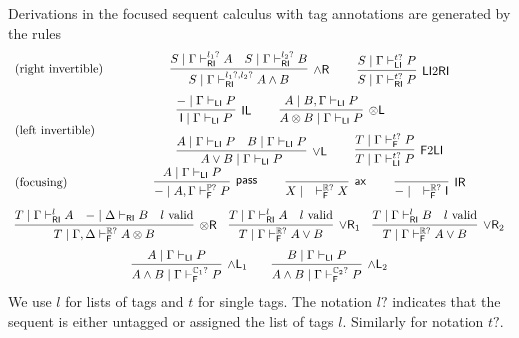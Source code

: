 \documentclass[submission,copyright,creativecommons]{eptcs}
\theoremstyle{definition}
\newcommand{\tl}{\otimes \mathsf{L}}
\newcommand{\tr}{\otimes \mathsf{R}}
\newcommand{\pass}{\mathsf{pass}}
\newcommand{\unitl}{\mathsf{IL}}
\newcommand{\unitr}{\mathsf{IR}}
\newcommand{\andlone}{\land \mathsf{L}_{1}}
\newcommand{\andltwo}{\land \mathsf{L}_{2}}
\newcommand{\andr}{\land \mathsf{R}}
\newcommand{\orl}{\lor \mathsf{L}}
\newcommand{\orrone}{\lor \mathsf{R}_{1}}
\newcommand{\orrtwo}{\lor \mathsf{R}_{2}}
\newcommand{\ax}{\mathsf{ax}}
\newcommand{\ot}{\otimes}
\newcommand{\I}{\mathsf{I}}
\newcommand{\RI}{\mathsf{RI}}
\newcommand{\LI}{\mathsf{LI}}
\newcommand{\F}{\mathsf{F}}
\newcommand{\tP}{\mathbb{P}}
\newcommand{\tCone}{\mathbb{C}_1}
\newcommand{\tCtwo}{\mathbb{C}_2}
\newcommand{\tE}{\mathbb{R}}
\newcommand{\proofbox}[1]{\begin{tabular}{l} #1 \end{tabular}}
\begin{document}
Derivations in the focused sequent calculus with tag annotations are generated by the rules
\begin{equation}\label{eq:focus}
  \begin{array}{lc}
    \text{(right invertible)} &
    \proofbox{
      \infer[\andr]{S \mid \Gamma \vdash^{l_1?, l_2?}_{\RI} A \land B}{
        S \mid \Gamma \vdash^{l_1?}_{\RI} A
        &
        S \mid \Gamma \vdash^{l_2?}_{\RI} B
      }
    \qquad
    \infer[\LI 2 \RI]{S \mid \Gamma \vdash^{t?}_{\RI} P}{S \mid \Gamma \vdash^{t?}_{\LI} P}
    }
    \\[15pt]
    \text{(left invertible)} &
    \proofbox{
      \infer[\unitl]{\I \mid \Gamma \vdash_{\LI} P}{{-} \mid \Gamma \vdash_{\LI} P}
    \qquad
    \infer[\tl]{A \ot B \mid \Gamma \vdash_{\LI} P}{A \mid B , \Gamma \vdash_{\LI} P}
    \\[6pt]
    \infer[\orl]{A \lor B \mid \Gamma \vdash_\LI P}{
      A \mid \Gamma \vdash_\LI P
      &
      B \mid \Gamma \vdash_\LI P
    }
    \qquad
    \infer[\F 2 \LI]{T \mid \Gamma \vdash^{t?}_{\LI} P}{T \mid \Gamma \vdash^{t?}_{\F} P}
    }
    \\[15pt]
    \text{(focusing)} &
    \proofbox{
    \infer[\pass]{{-} \mid A , \Gamma \vdash^{\tP?}_{\F} P }{
        A \mid \Gamma \vdash_{\LI} P
    }
    \qquad
    \infer[\ax]{X \mid \quad \vdash^{\tE?}_{\F} X}{}
    \qquad
    \infer[\unitr]{{-} \mid \quad \vdash^{\tE?}_{\F} \I}{}
    }
    \\[15pt]
    \multicolumn{2}{c}{
    \infer[\tr]{T \mid \Gamma , \Delta \vdash^{\tE?}_{\F} A \ot B}{
      T \mid \Gamma \vdash^{l}_{\RI} A
      &
      {-} \mid \Delta \vdash_{\RI} B
      &
      l \ \text{valid}
    }
    \quad
    \infer[\orrone]{T \mid \Gamma \vdash^{\tE?}_{\F} A \lor B}{
      T \mid \Gamma \vdash^{l}_{\RI} A
      &
      l \ \text{valid}
    }
    \quad
    \infer[\orrtwo]{T \mid \Gamma \vdash^{\tE?}_{\F} A \lor B}{
      T \mid \Gamma \vdash^{l}_{\RI} B
      &
      l \ \text{valid}
    }
    }
    \\[6pt]
    \multicolumn{2}{c}{
    \infer[\andlone]{A \land B \mid \Gamma \vdash^{\tCone?}_{\F} P}{A \mid \Gamma \vdash_{\LI} P}
    \qquad
    \infer[\andltwo]{A \land B \mid \Gamma \vdash^{\tCtwo?}_{\F} P}{B \mid \Gamma \vdash_{\LI} P}
    }
  \end{array}
\end{equation}
We use $l$ for lists of tags and $t$ for single tags.
The notation $l?$ indicates that the sequent is either untagged or assigned the list of tags $l$. Similarly for notation $t?$.
\end{document}
